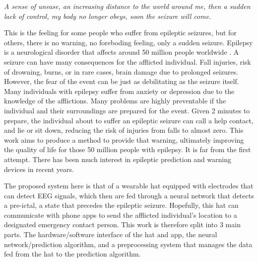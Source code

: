 \textit{A sense of unease, an increasing distance to the world around me, then a sudden lack of control, my body no longer obeys, soon the seizure will come.}


This is the feeling for some people who suffer from epileptic seizures, but for others, there is no warning, no foreboding feeling, only a sudden seizure. Epilepsy is a neurological disorder that affects around 50 million people worldwide \cite{WHODAT}.
A seizure can have many consequences for the afflicted individual. Fall injuries, risk of drowning, burns, or in rare cases, brain damage due to prolonged seizures. However, the fear of the event can be just as debilitating as the seizure itself. Many individuals with epilepsy suffer from anxiety or depression due to the knowledge of the afflictions. Many problems are highly preventable if the individual and their surroundings are prepared for the event. Given 2 minutes to prepare, the individual about to suffer an epileptic seizure can call a help contact, and lie or sit down, reducing the risk of injuries from falls to almost zero. This work aims to produce a method to provide that warning, ultimately improving the quality of life for those 50 million people with epilepsy. It is far from the first attempt. There has been much interest in epileptic prediction and warning devices in recent years. 


The proposed system here is that of a wearable hat equipped with electrodes that can detect EEG signals, which then are fed through a neural network that detects a pre-ictal, a state that precedes the epileptic seizure. Hopefully, this hat can communicate with phone apps to send the afflicted individual's location to a designated emergency contact person. This work is therefore split into 3 main parts. The hardware/software interface of the hat and app, the neural network/prediction algorithm, and a preprocessing system that manages the data fed from the hat to the prediction algorithm.






